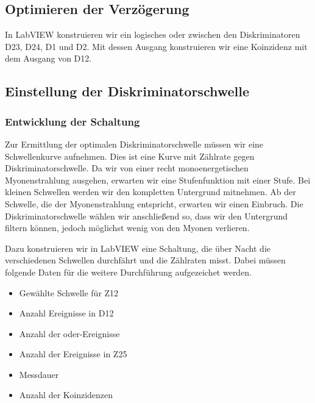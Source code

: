 \documentclass[11pt, ngerman, fleqn, DIV=15, headinclude, BCOR=2cm]{scrreprt}
\begin{document}
\subsection{Optimieren der Verzögerung}
\label{sec:optimieren_verzoegerung}

In LabVIEW konstruieren wir ein logisches oder zwischen den Diskriminatoren D23,
D24, D1 und D2. Mit dessen Ausgang konstruieren wir eine Koinzidenz mit dem
Ausgang von D12.

\subsection{Einstellung der Diskriminatorschwelle}
\label{sec:einstellung_diskriminatorschwelle}

\subsubsection{Entwicklung der Schaltung}

Zur Ermittlung der optimalen Diskriminatorschwelle müssen wir eine
Schwellenkurve aufnehmen. Dies ist eine Kurve mit Zählrate gegen
Diskriminatorschwelle. Da wir von einer recht monoenergetischen Myonenstrahlung
ausgehen, erwarten wir eine Stufenfunktion mit einer Stufe. Bei kleinen
Schwellen werden wir den kompletten Untergrund mitnehmen. Ab der Schwelle, die
der Myonenstrahlung entspricht, erwarten wir einen Einbruch. Die
Diskriminatorschwelle wählen wir anschließend so, dass wir den Untergrund
filtern können, jedoch möglichst wenig von den Myonen verlieren.

Dazu konstruieren wir in LabVIEW eine Schaltung, die über Nacht die
verschiedenen Schwellen durchfährt und die Zählraten misst. Dabei müssen
folgende Daten für die weitere Durchführung aufgezeichet werden.

\begin{itemize}
    \item
        Gewählte Schwelle für Z12

    \item
        Anzahl Ereignisse in D12

    \item
        Anzahl der oder-Ereignisse

    \item
        Anzahl der Ereignisse in Z25

    \item
        Messdauer

    \item
        Anzahl der Koinzidenzen
\end{itemize}
\end{document}
